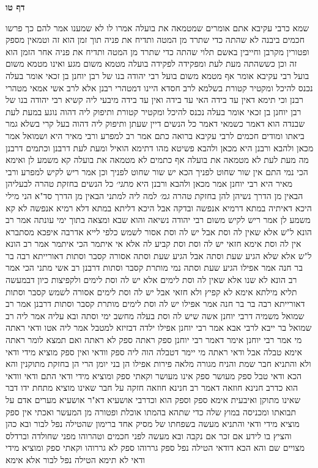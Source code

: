 \documentclass[12pt, openany]{book}
\newcommand{\sethebfont}{
\fontsize{10.5pt}{21.0pt} \selectfont
}
\newcommand{\twocol}[1]{
	{\sethebfont \begin{multicols}{2}
			#1
	\end{multicols}}	
}
\newcommand{\sectname}{}
\newcommand{\newsection}[1]{
	\addcontentsline{toc}{section}{#1}
	\renewcommand{\sectname}{#1}	
	\vspace{-\baselineskip}
	\begin{center}
		\textbf{%
\fontsize{16pt}{16pt}\selectfont
			#1}
	\end{center}
	\vspace{-\baselineskip}
	\nopagebreak
}
\begin{document}
\newsection{דף טו}
\twocol{שמא כרבי עקיבא אתם אומרים שמטמאה את בועלה  אמרו לו  לא שמענו 
אמר להם כך פרשו חכמים ביבנה  לא שהתה כדי שתרד מן המטה ותדיח את פניה תוך זמן הוא זה וטמאין מספק ופטורין מקרבן וחייבין באשם תלוי 
שהתה כדי שתרד מן המטה ותדיח את פניה אחר הזמן הוא זה 
וכן כששהתה מעת לעת ומפקידה לפקידה בועלה מטמא משום מגע ואינו מטמא משום בועל  רבי עקיבא אומר  אף מטמא משום בועל  רבי יהודה בנו של רבן יוחנן בן זכאי אומר  בעלה נכנס להיכל ומקטיר קטורת 
בשלמא לרב חסדא היינו דמטהרי רבנן 
אלא לרב אשי אמאי מטהרי רבנן 
וכי תימא  דאין עד בידה האי עד בידה ואין עד בידה מיבעי ליה  קשיא
רבי יהודה בנו של רבן יוחנן בן זכאי אומר  בעלה נכנס להיכל ומקטיר קטורת  ותיפוק ליה דהוה נוגע במעת לעת שבנדה 
הוא דאמר כשמאי דאמר  כל הנשים דיין שעתן 
ותיפוק ליה דהוה בעל קרי  בשלא גמר ביאתו
ומודים חכמים לרבי עקיבא ברואה כתם אמר רב  למפרע ורבי מאיר היא 
ושמואל אמר  מכאן ולהבא ורבנן היא  מכאן ולהבא פשיטא 
מהו דתימא  הואיל ומעת לעת דרבנן וכתמים דרבנן מה מעת לעת לא מטמאה את בועלה אף כתמים לא מטמאה את בועלה קא משמע לן 
ואימא הכי נמי  התם אין שור שחוט לפניך הכא יש שור שחוט לפניך 
וכן אמר ריש לקיש  למפרע ורבי מאיר היא  רבי יוחנן אמר  מכאן ולהבא ורבנן היא
{\large\emph{מתני׳}} כל הנשים בחזקת טהרה לבעליהן הבאין מן הדרך נשיהן להן בחזקת טהרה
{\large\emph{גמ׳}} למה ליה למתני הבאין מן הדרך סד"א  הני מילי היכא דאיתיה במתא דרמיא אנפשה ובדקה אבל היכא דליתא במתא דלא רמיא אנפשה לא קא משמע לן 
אמר ריש לקיש משום רבי יהודה נשיאה  והוא שבא ומצאה בתוך ימי עונתה 
אמר רב הונא  ל"ש אלא שאין לה וסת  אבל יש לה וסת אסור לשמש 
כלפי לייא  אדרבה איפכא מסתברא  אין לה וסת אימא חזאי יש לה וסת וסת קביע לה 
אלא אי איתמר הכי איתמר אמר רב הונא  ל"ש אלא שלא הגיע שעת וסתה אבל הגיע שעת וסתה אסורה  קסבר  וסתות דאורייתא 
רבה בר בר חנה אמר  אפילו הגיע שעת וסתה נמי מותרת קסבר  וסתות דרבנן 
רב אשי מתני הכי אמר רב הונא
לא שנו אלא שאין לה וסת לימים אלא יש לה וסת לימים ולקפיצות כיון דבמעשה תליא מילתא אימא לא קפיץ ולא חזאי  אבל יש לה וסת לימים אסורה לשמש
קסבר וסתות דאורייתא 
רבה בר בר חנה אמר  אפילו יש לה וסת לימים מותרת קסבר וסתות דרבנן 
אמר רב שמואל משמיה דרבי יוחנן  אשה שיש לה וסת בעלה מחשב ימי וסתה ובא עליה 
אמר ליה רב שמואל בר ייבא לרבי אבא  אמר רבי יוחנן אפילו ילדה דבזיזא למטבל 
אמר ליה  אטו ודאי ראתה מי אמר רבי יוחנן  אימר דאמר רבי יוחנן ספק ראתה ספק לא ראתה ואם תמצא לומר ראתה אימא טבלה
אבל ודאי ראתה מי יימר דטבלה  הוה ליה ספק וודאי ואין ספק מוציא מידי ודאי 
ולא  והתניא  חבר שמת והניח מגורה מלאה פירות אפילו הן בני יומן הרי הן בחזקת מתוקנין  והא הכא ודאי טבל ספק מעושר ספק אינו מעושר וקאתי ספק ומוציא מידי ודאי 
התם ודאי וודאי הוא כדרב חנינא חוזאה  דאמר רב חנינא חוזאה  חזקה על חבר שאינו מוציא מתחת ידו דבר שאינו מתוקן 
ואיבעית אימא  ספק וספק הוא וכדרבי אושעיא  דא"ר אושעיא  מערים אדם על תבואתו ומכניסה במוץ שלה כדי שתהא בהמתו אוכלת ופטורה מן המעשר 
ואכתי אין ספק מוציא מידי ודאי  והתניא  מעשה בשפחתו של מסיק אחד ברימון שהטילה נפל לבור ובא כהן והציץ בו לידע אם זכר אם נקבה
ובא מעשה לפני חכמים וטהרוהו מפני שחולדה וברדלס מצויים שם 
והא הכא דודאי הטילה נפל ספק גררוהו ספק לא גררוהו וקאתי ספק ומוציא מידי ודאי 
לא תימא הטילה נפל לבור אלא אימא}
\end{document}

